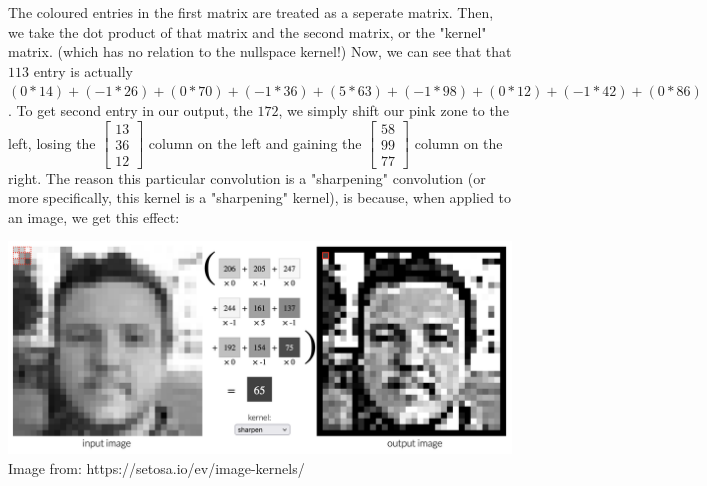 \documentclass{article}
\begin{document}
The coloured entries in the first matrix are treated as a seperate matrix. Then, we take the dot product of that matrix and the second matrix, or the "kernel" matrix. (which has no relation to the nullspace kernel!) Now, we can see that that $113$ entry is actually $(0*14)+(-1*26)+(0*70)+(-1*36)+(5*63)+(-1*98)+(0*12)+(-1*42)+(0*86)$. To get second entry in our output, the $172$, we simply shift our pink zone to the left, losing the $\begin{bmatrix}
    13 \\ 36 \\ 12
\end{bmatrix}$ column on the left and gaining the $\begin{bmatrix}
    58 \\ 99 \\ 77
\end{bmatrix}$ column on the right. The reason this particular convolution is a "sharpening" convolution (or more specifically, this kernel is a "sharpening" kernel), is because, when applied to an image, we get this effect:\\
\begin{center}
    \includegraphics[scale=0.22]{sharpen.png}\\
    Image from: https://setosa.io/ev/image-kernels/
\end{center}
\end{document}
